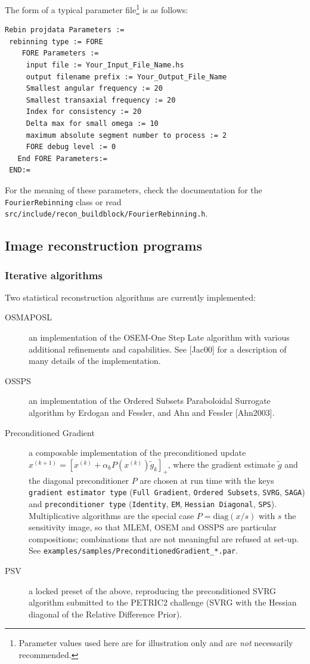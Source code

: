 \documentclass{article}
\begin{document}
The form of a typical parameter file\footnote{Parameter values used here are for
illustration only and are \textit{not} necessarily recommended.} is as follows:

{\small 
\begin{verbatim}
Rebin projdata Parameters :=
 rebinning type := FORE
    FORE Parameters :=
     input file := Your_Input_File_Name.hs
     output filename prefix := Your_Output_File_Name
     Smallest angular frequency := 20
     Smallest transaxial frequency := 20
     Index for consistency := 20
     Delta max for small omega := 10
     maximum absolute segment number to process := 2
     FORE debug level := 0
   End FORE Parameters:=
 END:=
\end{verbatim}
}
For the meaning of these parameters, check the documentation for the
\texttt{FourierRebinning} class or read
\texttt{src/include/recon\_buildblock/FourierRebinning.h}.

\subsection{
Image reconstruction programs}
\label{sec:imagereconstructionprograms}



\subsubsection{
Iterative algorithms}

Two statistical reconstruction algorithms are currently implemented:
\begin{description}
\item[OSMAPOSL] an implementation 
of the OSEM-One Step Late algorithm with various additional refinements 
and capabilities. See [Jac00] for a description of many details of the
implementation.
\item[OSSPS] an implementation of the Ordered Subsets Paraboloidal
Surrogate algorithm by Erdogan and Fessler, and Ahn and Fessler [Ahn2003]. 
\item[Preconditioned Gradient] a composable implementation of the preconditioned update
$x^{(k+1)}=\left[x^{(k)}+\alpha_k P(x^{(k)})\tilde g_k\right]_+$, where the gradient estimate
$\tilde g$ and the diagonal preconditioner $P$ are chosen at run time with the keys
\texttt{gradient estimator type} (\texttt{Full Gradient}, \texttt{Ordered Subsets},
\texttt{SVRG}, \texttt{SAGA}) and \texttt{preconditioner type} (\texttt{Identity},
\texttt{EM}, \texttt{Hessian Diagonal}, \texttt{SPS}). Multiplicative algorithms are the
special case $P=\mathrm{diag}(x/s)$ with $s$ the sensitivity image, so that MLEM, OSEM and
OSSPS are particular compositions; combinations that are not meaningful are refused at set-up.
See \texttt{examples/samples/PreconditionedGradient\_*.par}.
\item[PSV] a locked preset of the above, reproducing the preconditioned SVRG algorithm submitted
to the PETRIC2 challenge (SVRG with the Hessian diagonal of the Relative Difference Prior).
\end{description}
\end{document}

